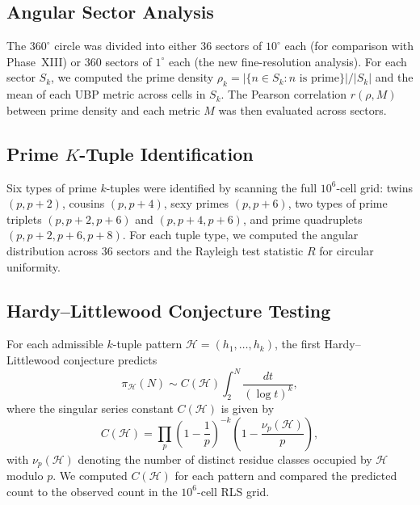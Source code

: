 \documentclass[11pt,a4paper]{article}
\theoremstyle{definition}
\begin{document}
\subsection{Angular Sector Analysis}

The $360^{\circ}$ circle was divided into either $36$ sectors of $10^{\circ}$
each (for comparison with Phase~XIII) or $360$ sectors of $1^{\circ}$ each (the
new fine-resolution analysis).  For each sector $S_k$, we computed the prime
density $\rho_k = |\{n \in S_k : n \text{ is prime}\}| / |S_k|$ and the mean
of each UBP metric across cells in $S_k$.  The Pearson correlation $r(\rho, M)$
between prime density and each metric $M$ was then evaluated across sectors.

\subsection{Prime $K$-Tuple Identification}

Six types of prime $k$-tuples were identified by scanning the full $10^6$-cell
grid: twins $(p, p+2)$, cousins $(p, p+4)$, sexy primes $(p, p+6)$, two types
of prime triplets $(p, p+2, p+6)$ and $(p, p+4, p+6)$, and prime quadruplets
$(p, p+2, p+6, p+8)$.  For each tuple type, we computed the angular
distribution across $36$ sectors and the Rayleigh test statistic $R$ for
circular uniformity.

\subsection{Hardy--Littlewood Conjecture Testing}

For each admissible $k$-tuple pattern $\mathcal{H} = (h_1, \ldots, h_k)$, the
first Hardy--Littlewood conjecture predicts
\begin{equation}
    \pi_{\mathcal{H}}(N) \sim C(\mathcal{H}) \int_2^N \frac{dt}{(\log t)^k},
    \label{eq:hl}
\end{equation}
where the singular series constant $C(\mathcal{H})$ is given by
\begin{equation}
    C(\mathcal{H}) = \prod_p \left(1 - \frac{1}{p}\right)^{-k}
    \left(1 - \frac{\nu_p(\mathcal{H})}{p}\right),
    \label{eq:hl_const}
\end{equation}
with $\nu_p(\mathcal{H})$ denoting the number of distinct residue classes
occupied by $\mathcal{H}$ modulo $p$.  We computed $C(\mathcal{H})$ for each
pattern and compared the predicted count to the observed count in the
$10^6$-cell RLS grid.
\end{document}
